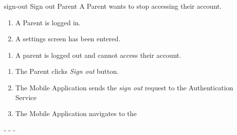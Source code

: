 {sign-out}
{Sign out}
{Parent}
{A Parent wants to stop accessing their account.}
{\begin{enumerate} %
    \item A Parent is logged in.
    \item A settings screen has been entered.
\end{enumerate}}
{\begin{enumerate} %
   \item A parent is logged out and cannot access their account.
\end{enumerate}}
{\begin{enumerate} %
   \item The Parent clicks \textit{Sign out} button.
   \item The Mobile Application sends the \textit{sign out} request to the Authentication Service
   \item The Mobile Application navigates to the 
\end{enumerate}}
{-}%
{-}
{-} %

